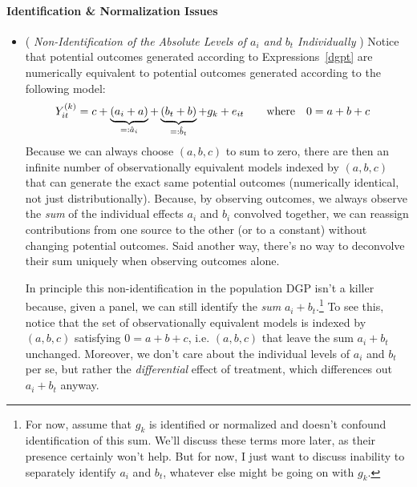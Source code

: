 \documentclass[12pt]{article}
\theoremstyle{plain}
\theoremstyle{definition}
\theoremstyle{remark}
\begin{document}
\paragraph{Identification \& Normalization Issues}
\begin{itemize}
  \item
    (\emph{%
      Non-Identification of the Absolute Levels of $a_i$ and $b_t$
      Individually%
    })
    Notice that potential outcomes generated according to
    Expressions~\ref{dgpt} are numerically equivalent to potential
    outcomes generated according to the following model:
    \begin{align*}
      Y_{it}^{(k)}
      &=
      c
      +
      \underbrace{%
        ({a}_i+a)
      }_{%
        =:\hat{a}_i
      }
      +
      \underbrace{%
      ({b}_t+b)
      }_{%
        =:\hat{b}_t
      }
      +
      g_k
      +
      e_{it}
      \qquad\text{where}\quad
      0 = a+b+c
    \end{align*}
    Because we can always choose $(a,b,c)$ to sum to zero, there are
    then an infinite number of observationally equivalent models indexed
    by $(a,b,c)$ that can generate the exact same potential outcomes
    (numerically identical, not just distributionally).
    Because, by observing outcomes, we always observe the \emph{sum} of
    the individual effects $a_i$ and $b_i$ convolved together, we can
    reassign contributions from one source to the other (or to a
    constant) without changing potential outcomes.
    Said another way, there's no way to deconvolve their sum uniquely
    when observing outcomes alone.

    In principle this non-identification in the population DGP isn't a
    killer because, given a panel, we can still identify the \emph{sum}
    $a_i+b_t$.\footnote{%
      For now, assume that $g_k$ is identified or normalized and doesn't
      confound identification of this sum.
      We'll discuss these terms more later, as their presence certainly
      won't help.
      But for now, I just want to discuss inability to separately
      identify $a_i$ and $b_t$, whatever else might be going on with
      $g_k$.
    }
    To see this, notice that the set of observationally equivalent
    models is indexed by $(a,b,c)$ satisfying $0=a+b+c$, i.e. $(a,b,c)$
    that leave the sum $a_i+b_t$ unchanged.
    Moreover, we don't care about the individual levels of $a_i$ and
    $b_t$ per se, but rather the \emph{differential} effect of
    treatment, which differences out $a_i+b_t$ anyway.


\end{itemize}
\end{document}
